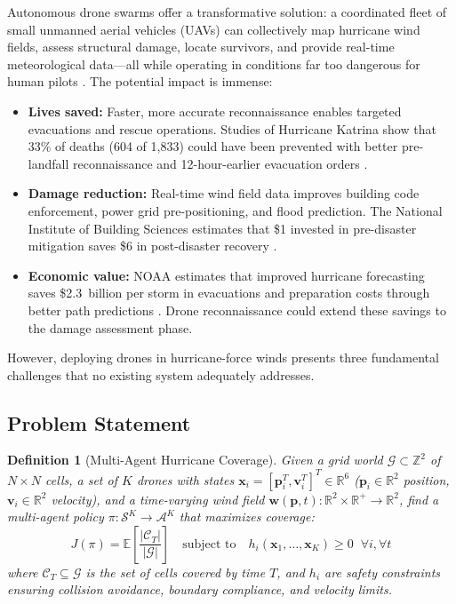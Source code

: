 \documentclass[12pt,a4paper,twocolumn]{article}
\newcommand{\cA}{\mathcal{A}}
\newcommand{\cG}{\mathcal{G}}
\newcommand{\cC}{\mathcal{C}}
\newcommand{\cS}{\mathcal{S}}
\newcommand{\R}{\mathbb{R}}
\newcommand{\Z}{\mathbb{Z}}
\newcommand{\E}{\mathbb{E}}
\newcommand{\vect}[1]{\mathbf{#1}}
\newtheorem{definition}[theorem]{Definition}
\begin{document}
Autonomous drone swarms offer a transformative solution: a coordinated fleet of small unmanned aerial vehicles (UAVs) can collectively map hurricane wind fields, assess structural damage, locate survivors, and provide real-time meteorological data---all while operating in conditions far too dangerous for human pilots \citep{Fisher2016}. The potential impact is immense:
\begin{itemize}[leftmargin=*]
    \item \textbf{Lives saved:} Faster, more accurate reconnaissance enables targeted evacuations and rescue operations. Studies of Hurricane Katrina show that 33\% of deaths (604 of 1,833) could have been prevented with better pre-landfall reconnaissance and 12-hour-earlier evacuation orders \citep{Khalil2002}.
    \item \textbf{Damage reduction:} Real-time wind field data improves building code enforcement, power grid pre-positioning, and flood prediction. The National Institute of Building Sciences estimates that \$1 invested in pre-disaster mitigation saves \$6 in post-disaster recovery \citep{FEMA2019}.
    \item \textbf{Economic value:} NOAA estimates that improved hurricane forecasting saves \$2.3~billion per storm in evacuations and preparation costs through better path predictions \citep{NOAA2023}. Drone reconnaissance could extend these savings to the damage assessment phase.
\end{itemize}

However, deploying drones in hurricane-force winds presents three fundamental challenges that no existing system adequately addresses.

\subsection{Problem Statement}
\label{sec:problem}

\begin{definition}[Multi-Agent Hurricane Coverage]
\label{def:problem}
Given a grid world $\cG \subset \Z^2$ of $N \times N$ cells, a set of $K$ drones with states $\vect{x}_i = [\vect{p}_i^T, \vect{v}_i^T]^T \in \R^6$ ($\vect{p}_i \in \R^2$ position, $\vect{v}_i \in \R^2$ velocity), and a time-varying wind field $\vect{w}(\vect{p}, t) : \R^2 \times \R^+ \to \R^2$, find a multi-agent policy $\pi : \cS^K \to \cA^K$ that maximizes coverage:
\begin{equation}
    J(\pi) = \E\left[\frac{|\cC_T|}{|\cG|}\right] \quad \text{subject to} \quad h_i(\vect{x}_1, \ldots, \vect{x}_K) \geq 0 \;\; \forall i, \forall t
\end{equation}
where $\cC_T \subseteq \cG$ is the set of cells covered by time $T$, and $h_i$ are safety constraints ensuring collision avoidance, boundary compliance, and velocity limits.
\end{definition}
\end{document}
